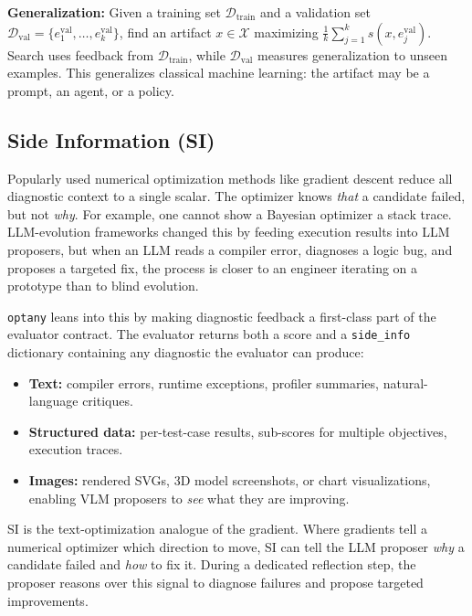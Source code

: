 \documentclass[sigconf,anonymous,review]{acmart}
\newcommand{\oa}{\texttt{optany}}
\newcommand{\asi}{SI}
\begin{document}
\textbf{Generalization:} Given a training set $\mathcal{D}_{\text{train}}$ and a validation set $\mathcal{D}_{\text{val}}=\{e^{\text{val}}_1,\ldots,e^{\text{val}}_k\}$, find an artifact $x\in\mathcal{X}$ maximizing $\frac{1}{k}\sum_{j=1}^{k} s\!\left(x,e^{\text{val}}_j\right)$. Search uses feedback from $\mathcal{D}_{\text{train}}$, while $\mathcal{D}_{\text{val}}$ measures generalization to unseen examples. This generalizes classical machine learning: the artifact may be a prompt, an agent, or a policy.

\subsection{Side Information (\asi{})}\label{sec:asi}

Popularly used numerical optimization methods like gradient descent reduce all diagnostic context to a single scalar. The optimizer knows \emph{that} a candidate failed, but not \emph{why}. For example, one cannot show a Bayesian optimizer a stack trace. LLM-evolution frameworks changed this by feeding execution results into LLM proposers, but when an LLM reads a compiler error, diagnoses a logic bug, and proposes a targeted fix, the process is closer to an engineer iterating on a prototype than to blind evolution.

\oa{} leans into this by making diagnostic feedback a first-class part of the evaluator contract. The evaluator returns both a score and a \texttt{side\_info} dictionary containing any diagnostic the evaluator can produce:

\begin{itemize}[leftmargin=*,itemsep=1pt]
  \item \textbf{Text:} compiler errors, runtime exceptions, profiler summaries, natural-language critiques.
  \item \textbf{Structured data:} per-test-case results, sub-scores for multiple objectives, execution traces.
  \item \textbf{Images:} rendered SVGs, 3D model screenshots, or chart visualizations, enabling VLM proposers to \emph{see} what they are improving.
\end{itemize}

\asi{} is the text-optimization analogue of the gradient. Where gradients tell a numerical optimizer which direction to move, \asi{} can tell the LLM proposer \emph{why} a candidate failed and \emph{how} to fix it. During a dedicated reflection step, the proposer reasons over this signal to diagnose failures and propose targeted improvements.
\end{document}
